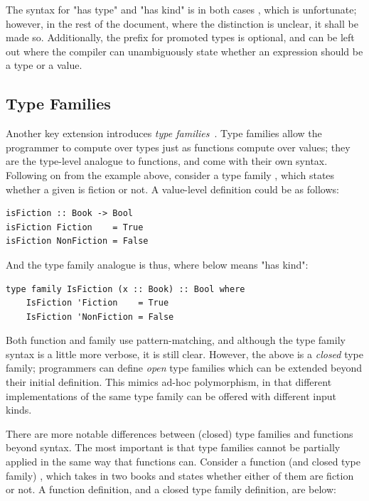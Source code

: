 The syntax for "has type" and "has kind" is in both cases \inline{::}, which is unfortunate; however, in the rest of the document, where the distinction is unclear, it shall be made so. Additionally, the prefix  for promoted types is optional, and can be left out where the compiler can unambiguously state whether an expression should be a type or a value.

\subsection{Type Families}

Another key extension introduces \emph{type families}~\cite{opentfs,closedtfs}. Type families allow the programmer to compute over types just as functions compute over values; they are the type-level analogue to functions, and come with their own syntax. Following on from the  example above, consider a type family , which states whether a given  is fiction or not. A value-level definition could be as follows:

\begin{lstlisting}
isFiction :: Book -> Bool
isFiction Fiction    = True
isFiction NonFiction = False
\end{lstlisting}

And the type family analogue is thus, where \inline{::} below means "has kind":

\begin{lstlisting}
type family IsFiction (x :: Book) :: Bool where
    IsFiction 'Fiction    = True
    IsFiction 'NonFiction = False
\end{lstlisting}

Both function and family use pattern-matching, and although the type family syntax is a little more verbose, it is still clear. However, the above is a \emph{closed} type family; programmers can define \emph{open} type families which can be extended beyond their initial definition. This mimics ad-hoc polymorphism, in that different implementations of the same type family can be offered with different input kinds.

There are more notable differences between (closed) type families and functions beyond syntax. The most important is that type families cannot be partially applied in the same way that functions can. Consider a function (and closed type family) , which takes in two books and states whether either of them are fiction or not. A function definition, and a closed type family definition, are below:

